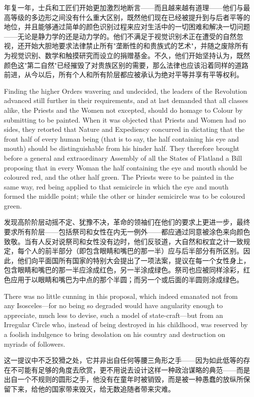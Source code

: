 \documentclass[12pt,UTF8]{ctexbook}
\begin{document}
年复一年，士兵和工匠们开始更加激烈地断言——而且越来越有道理——他们与最高等级的多边形之间没有什么重大区别，既然他们现在已经被提升到与后者平等的地位，并且能够通过简单的颜色识别过程来应对生活中的一切困难和解决一切问题——无论是静力学的还是动力学的。他们不满足于视觉识别术正在遭受的自然忽视，还开始大胆地要求法律禁止所有"垄断性的和贵族式的艺术"，并随之废除所有为视觉识别、数学和触摸研究而设立的捐赠基金。不久，他们开始坚持认为，既然颜色这"第二自然"已经摧毁了对贵族区别的需要，那么法律也应该沿着同样的道路前进，从今以后，所有个人和所有阶层都应被承认为绝对平等并享有平等权利。

Finding the higher Orders wavering and undecided, the leaders of the Revolution advanced still further in their requirements, and at last demanded that all classes alike, the Priests and the Women not excepted, should do homage to Colour by submitting to be painted. When it was objected that Priests and Women had no sides, they retorted that Nature and Expediency concurred in dictating that the front half of every human being (that is to say, the half containing his eye and mouth) should be distinguishable from his hinder half. They therefore brought before a general and extraordinary Assembly of all the States of Flatland a Bill proposing that in every Woman the half containing the eye and mouth should be coloured red, and the other half green. The Priests were to be painted in the same way, red being applied to that semicircle in which the eye and mouth formed the middle point; while the other or hinder semicircle was to be coloured green.

发现高阶阶层动摇不定、犹豫不决，革命的领袖们在他们的要求上更进一步，最终要求所有阶层——包括祭司和女性在内无一例外——都应通过同意被涂色来向颜色致敬。当有人反对说祭司和女性没有边时，他们反驳道，大自然和权宜之计一致规定，每个人的前半部分（即包含眼睛和嘴巴的那一半）应与后半部分有所区别。因此，他们向平面国所有国家的特别大会提出了一项法案，提议在每一个女性身上，包含眼睛和嘴巴的那一半应涂成红色，另一半涂成绿色。祭司也应被同样涂彩，红色应用于以眼睛和嘴巴为中点的那个半圆；而另一个或后面的半圆则涂成绿色。

There was no little cunning in this proposal, which indeed emanated not from any Isosceles---for no being so degraded would have angularity enough to appreciate, much less to devise, such a model of state-craft---but from an Irregular Circle who, instead of being destroyed in his childhood, was reserved by a foolish indulgence to bring desolation on his country and destruction on myriads of followers.

这一提议中不乏狡猾之处，它并非出自任何等腰三角形之手——因为如此低等的存在不可能有足够的角度去欣赏，更不用说去设计这样一种政治谋略的典范——而是出自一个不规则的圆形之手，他没有在童年时被销毁，而是被一种愚蠢的放纵所保留下来，给他的国家带来毁灭，给无数追随者带来灾难。
\end{document}
